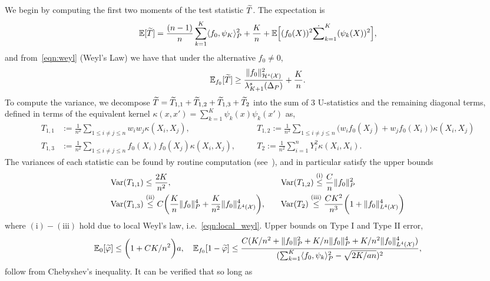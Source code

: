 We begin by computing the first two moments of the test statistic $\widetilde{T}$. The expectation is
\begin{align*}
\mathbb{E}[\widetilde{T}] = \frac{(n - 1)}{n} \sum_{k = 1}^{K} \langle f_0, \psi_K \rangle_P^2 + \frac{K}{n} + \mathbb{E}\Bigl[(f_0(X))^2 \dot \sum_{k = 1}^{K} (\psi_k(X))^2\Bigr],
\end{align*}
and from~\eqref{eqn:weyl} (Weyl's Law) we have that under the alternative $f_0 \neq 0$,
\begin{equation*}
\mathbb{E}_{f_0}[\widetilde{T}] \geq \frac{\|f_0\|_{\mathcal{H}^s(\mathcal{X})}^2}{\lambda_{K + 1}^s(\Delta_{P})} + \frac{K}{n}.
\end{equation*}
To compute the variance, we decompose $\widetilde{T} = \widetilde{T}_{1,1} + \widetilde{T}_{1,2} + \widetilde{T}_{1,3} + \widetilde{T}_2$ into the sum of 3 U-statistics and the remaining diagonal terms, defined in terms of the equivalent kernel $\kappa(x,x') = \sum_{k = 1}^{K} \psi_k(x) \psi_k(x')$ as,
\begin{align*}
T_{1,1} & := \frac{1}{n^2} \sum_{1 \leq i \neq j \leq n} w_i w_j \kappa(X_i,X_j),\quad && T_{1,2} := \frac{1}{n^2} \sum_{1 \leq i \neq j \leq n} \bigl(w_i f_0(X_j) + w_jf_0(X_i)\bigr)\kappa(X_i,X_j) \\
T_{1,3} & := \frac{1}{n^2} \sum_{1 \leq i \neq j \leq n} f_0(X_i) f_0(X_j) \kappa(X_i,X_j), \quad && T_2 := \frac{1}{n^2} \sum_{i = 1}^{n} Y_i^2 \kappa(X_i,X_i).
\end{align*}
The variances of each statistic can be found by routine computation (see~\cite{ingster2009}), and in particular satisfy the upper bounds
\begin{align*}
\mathrm{Var}(T_{1,1}) & \leq \frac{2K}{n^2}, \quad && \mathrm{Var}(T_{1,2}) \overset{\mathrm{(i)}}{\leq} \frac{C}{n}\|f_0\|_P^2\\
\mathrm{Var}(T_{1,3}) & \overset{\mathrm{(ii)}}{\leq} C\biggl(\frac{K}{n}\|f_0\|_P^4 + \frac{K}{n^2}\|f_0\|_{L^4(\mathcal{X})}^4\biggr), \quad && \mathrm{Var}(T_{2}) \overset{\mathrm{(iii)}}{\leq} \frac{CK^2}{n^3}\biggl(1 + \|f_0\|_{L^4(\mathcal{X})}^4\biggr)
\end{align*}
where $\mathrm{(i)}-\mathrm{(iii)}$ hold due to local Weyl's law, i.e.~\eqref{eqn:local_weyl}. Upper bounds on Type I and Type II error,
\begin{equation*}
\mathbb{E}_0[\widetilde{\varphi}] \leq \biggl(1 + CK/n^2\biggr)a, \quad \mathbb{E}_{f_0}[1 - \widetilde{\varphi}] \leq \frac{C(K/n^2 + \|f_0\|_P^2 + K/n \|f_0\|_P^4 + K/n^2 \|f_0\|_{L^4(\mathcal{X})}^4)}{(\sum_{k = 1}^{K} \langle f_0, \psi_k \rangle_P^2 - \sqrt{2K/an})^2},
\end{equation*}
follow from Chebyshev's inequality. It can be verified that so long as
